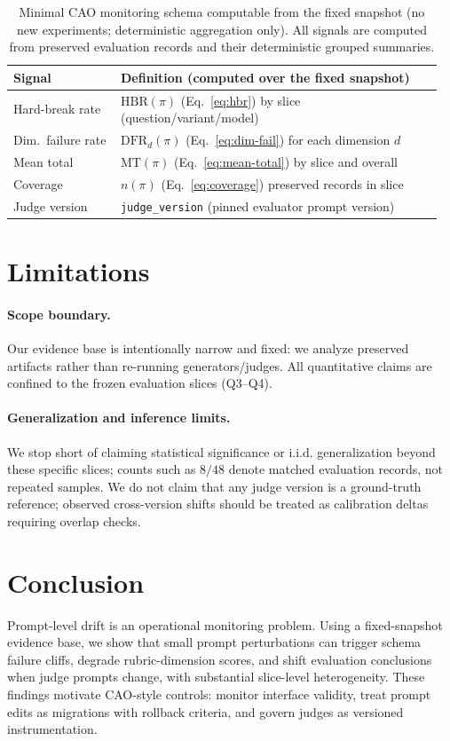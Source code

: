 \documentclass{article}
\begin{document}
\begin{table}[t]
\centering
\small
\begin{tabular}{@{}p{0.24\linewidth}p{0.72\linewidth}@{}}
\toprule
\textbf{Signal} & \textbf{Definition (computed over the fixed snapshot)}\\
\midrule
Hard-break rate & $\mathrm{HBR}(\pi)$ (Eq.~\ref{eq:hbr}) by slice (question/variant/model)\\
Dim.\ failure rate & $\mathrm{DFR}_{d}(\pi)$ (Eq.~\ref{eq:dim-fail}) for each dimension $d$\\
Mean total & $\mathrm{MT}(\pi)$ (Eq.~\ref{eq:mean-total}) by slice and overall\\
Coverage & $n(\pi)$ (Eq.~\ref{eq:coverage}) preserved records in slice\\
Judge version & \texttt{judge\_version} (pinned evaluator prompt version)\\
\bottomrule
\end{tabular}
\caption{Minimal CAO monitoring schema computable from the fixed snapshot (no new experiments; deterministic aggregation only). All signals are computed from preserved evaluation records and their deterministic grouped summaries.}
\label{tab:monitoring}
\end{table}

\section{Limitations}
\paragraph{Scope boundary.}
Our evidence base is intentionally narrow and fixed: we analyze preserved artifacts rather than re-running generators/judges.
All quantitative claims are confined to the frozen evaluation slices (Q3--Q4).

\paragraph{Generalization and inference limits.}
We stop short of claiming statistical significance or i.i.d. generalization beyond these specific slices; counts such as $8/48$ denote matched evaluation records, not repeated samples.
We do not claim that any judge version is a ground-truth reference; observed cross-version shifts should be treated as calibration deltas requiring overlap checks.

\section{Conclusion}
Prompt-level drift is an operational monitoring problem.
Using a fixed-snapshot evidence base, we show that small prompt perturbations can trigger schema failure cliffs, degrade rubric-dimension scores, and shift evaluation conclusions when judge prompts change, with substantial slice-level heterogeneity.
These findings motivate CAO-style controls: monitor interface validity, treat prompt edits as migrations with rollback criteria, and govern judges as versioned instrumentation.
\end{document}
